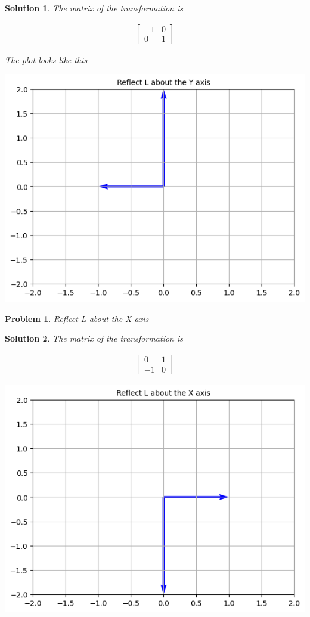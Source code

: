 \documentclass{article}
\newtheorem{problem}{Problem}
\newtheorem*{solution}{Solution}
\begin{document}
\begin{solution}
The matrix of the transformation is

\begin{align*}
\begin{bmatrix}
-1 & 0 \\ 
0 & 1
\end{bmatrix}
\end{align*}

The plot looks like this

\includegraphics[scale=0.5, center]{Lreflecty} 

\end{solution}

\begin{problem}
Reflect L about the X axis
\end{problem}

\begin{solution}
The matrix of the transformation is 

\begin{align*}
\begin{bmatrix}
0 & 1 \\ 
-1 & 0
\end{bmatrix}
\end{align*}

\includegraphics[scale=0.5, center]{Lreflectx} 

\end{solution}
\end{document}
